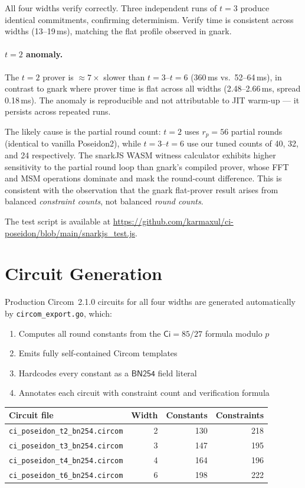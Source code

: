 \documentclass[preprint]{iacrtrans}
\newcommand{\Ci}{\ensuremath{\mathsf{Ci}}}
\newcommand{\BN}{\ensuremath{\mathsf{BN254}}}
\begin{document}
All four widths verify correctly. Three independent runs of $t=3$ produce
identical commitments, confirming determinism. Verify time is consistent
across widths (13--19\,ms), matching the flat profile observed in gnark.

\paragraph{$t=2$ anomaly.}
The $t=2$ prover is ${\approx}7\times$ slower than $t=3$--$t=6$
(360\,ms vs.\ 52--64\,ms), in contrast to gnark where prover time is
flat across all widths (2.48--2.66\,ms, spread 0.18\,ms). The anomaly
is reproducible and not attributable to JIT warm-up — it persists across
repeated runs.

The likely cause is the partial round count: $t=2$ uses $r_p = 56$
partial rounds (identical to vanilla Poseidon2), while $t=3$--$t=6$
use our tuned counts of 40, 32, and 24 respectively. The snarkJS WASM
witness calculator exhibits higher sensitivity to the partial round loop
than gnark's compiled prover, whose FFT and MSM operations dominate
and mask the round-count difference. This is consistent with the
observation that the gnark flat-prover result arises from balanced
\emph{constraint counts}, not balanced \emph{round counts}.

The test script is available at
\url{https://github.com/karmaxul/ci-poseidon/blob/main/snarkjs_test.js}.

\section{Circuit Generation}

Production Circom~2.1.0 circuits for all four widths are generated
automatically by \texttt{circom\_export.go}, which:
\begin{enumerate}
  \item Computes all round constants from the $\Ci = 85/27$ formula modulo $p$
  \item Emits fully self-contained Circom templates
  \item Hardcodes every constant as a $\BN$ field literal
  \item Annotates each circuit with constraint count and verification formula
\end{enumerate}

\begin{center}
\begin{tabular}{lrrr}
\toprule
Circuit file & Width & Constants & Constraints \\
\midrule
\texttt{ci\_poseidon\_t2\_bn254.circom} & 2 & 130 & 218 \\
\texttt{ci\_poseidon\_t3\_bn254.circom} & 3 & 147 & 195 \\
\texttt{ci\_poseidon\_t4\_bn254.circom} & 4 & 164 & 196 \\
\texttt{ci\_poseidon\_t6\_bn254.circom} & 6 & 198 & 222 \\
\bottomrule
\end{tabular}
\end{center}
\end{document}
